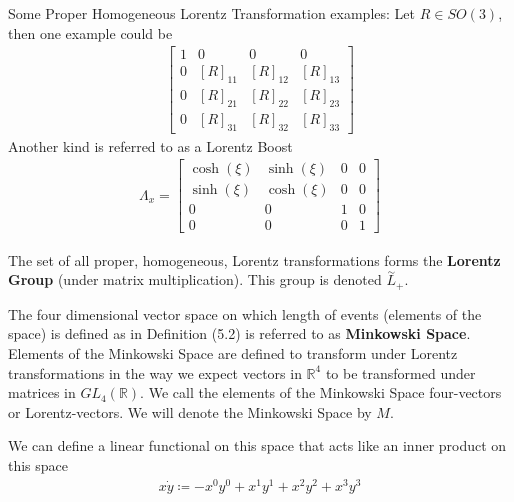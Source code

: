 \documentclass[compress,aspectratio=169,10pt,usenames,dvipsnames]{beamer}
\newcommand{\R}{\mathbb{R}}
\begin{document}
\begin{frame}
\vfill
Some Proper Homogeneous Lorentz Transformation examples:
\vfill
Let $R\in SO(3)$, then one example could be
\begin{equation}
\begin{aligned}
\begin{bmatrix}
	1&0&0&0\\
	0&[R]_{11}&[R]_{12}&[R]_{13}\\
	0&[R]_{21}&[R]_{22}&[R]_{23}\\
	0&[R]_{31}&[R]_{32}&[R]_{33}
\end{bmatrix}
\end{aligned}
\end{equation}
\vfill
Another kind is referred to as a Lorentz Boost
\begin{equation}
\begin{aligned}
	\Lambda_x = \begin{bmatrix}
						\cosh(\xi) & \sinh(\xi) & 0 & 0 \\
						\sinh(\xi) & \cosh(\xi) & 0 & 0 \\
						0&0&1&0\\
						0&0&0&1
					\end{bmatrix}
\end{aligned}
\end{equation}
\vfill
\end{frame}
%
%
\begin{frame}
\vfill
\begin{definition}
	The set of all proper, homogeneous, Lorentz transformations forms the \textbf{Lorentz Group} (under matrix multiplication). This group is denoted $\overset{\sim}{L}_+$.
\end{definition}
\vfill
\begin{definition}
	The four dimensional vector space on which length of events (elements of the space) is defined as in Definition (5.2) is referred to as \textbf{Minkowski Space}. Elements of the Minkowski Space are defined to transform under Lorentz transformations in the way we expect vectors in $\R^4$ to be transformed under matrices in $GL_4(\R)$. We call the elements of the Minkowski Space four-vectors or Lorentz-vectors. We will denote the Minkowski Space by $M$.
\end{definition}
\vfill
We can define a linear functional on this space that acts like an inner product on this space
\begin{equation}
\begin{aligned}
	x\dot y \coloneq -x^0y^0 + x^1y^1 + x^2y^2 + x^3y^3
\end{aligned}
\end{equation}
\end{frame}
\end{document}
